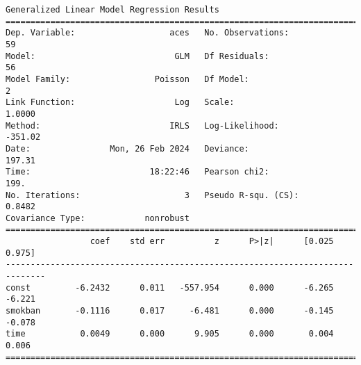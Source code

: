 \documentclass[11pt]{article}
\begin{document}
    \begin{Verbatim}[commandchars=\\\{\}]
                 Generalized Linear Model Regression Results
==============================================================================
Dep. Variable:                   aces   No. Observations:                   59
Model:                            GLM   Df Residuals:                       56
Model Family:                 Poisson   Df Model:                            2
Link Function:                    Log   Scale:                          1.0000
Method:                          IRLS   Log-Likelihood:                -351.02
Date:                Mon, 26 Feb 2024   Deviance:                       197.31
Time:                        18:22:46   Pearson chi2:                     199.
No. Iterations:                     3   Pseudo R-squ. (CS):             0.8482
Covariance Type:            nonrobust
==============================================================================
                 coef    std err          z      P>|z|      [0.025      0.975]
------------------------------------------------------------------------------
const         -6.2432      0.011   -557.954      0.000      -6.265      -6.221
smokban       -0.1116      0.017     -6.481      0.000      -0.145      -0.078
time           0.0049      0.000      9.905      0.000       0.004       0.006
==============================================================================
    \end{Verbatim}
\end{document}
